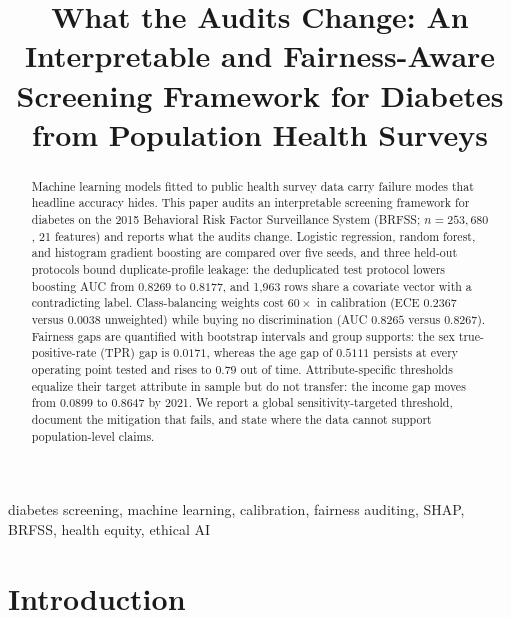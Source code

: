 \documentclass[conference]{IEEEtran}
\begin{document}
\title{What the Audits Change: An Interpretable and Fairness-Aware Screening Framework for Diabetes from Population Health Surveys}

\author{
\IEEEauthorblockA{\textit{[Department]} \\
\textit{[Institution]} \\
[City], [Country] \\
[email]}}

\maketitle

\begin{abstract}
Machine learning models fitted to public health survey data carry failure modes that headline accuracy hides. This paper audits an interpretable screening framework for diabetes on the 2015 Behavioral Risk Factor Surveillance System (BRFSS; $n = 253{,}680$, 21 features) and reports what the audits change. Logistic regression, random forest, and histogram gradient boosting are compared over five seeds, and three held-out protocols bound duplicate-profile leakage: the deduplicated test protocol lowers boosting AUC from $0.8269$ to $0.8177$, and 1{,}963 rows share a covariate vector with a contradicting label. Class-balancing weights cost $60\times$ in calibration (ECE $0.2367$ versus $0.0038$ unweighted) while buying no discrimination (AUC $0.8265$ versus $0.8267$). Fairness gaps are quantified with bootstrap intervals and group supports: the sex true-positive-rate (TPR) gap is $0.0171$, whereas the age gap of $0.5111$ persists at every operating point tested and rises to $0.79$ out of time. Attribute-specific thresholds equalize their target attribute in sample but do not transfer: the income gap moves from $0.0899$ to $0.8647$ by 2021. We report a global sensitivity-targeted threshold, document the mitigation that fails, and state where the data cannot support population-level claims.
\end{abstract}

\begin{IEEEkeywords}
diabetes screening, machine learning, calibration, fairness auditing, SHAP, BRFSS, health equity, ethical AI
\end{IEEEkeywords}

\section{Introduction}
\end{document}
